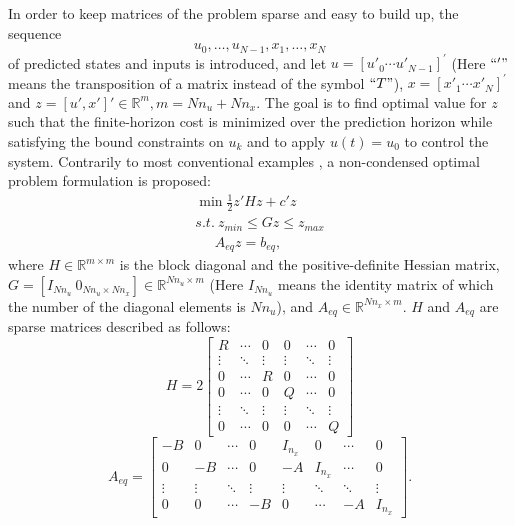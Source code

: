 \documentclass[journal]{IEEEtran}
\begin{document}
In order to keep matrices of the problem sparse and easy to build up, the sequence \[{u_0}, \ldots ,{u_{N - 1}},{x_1}, \ldots ,{x_N}\] of predicted states and inputs is introduced, and let $u = {\left[ {{u'_0} \cdots {u'_{N - 1}}} \right]^\prime }$ (Here $``'"$ means the transposition of a matrix instead of the symbol $``T"$), $x = {\left[ {{x'_1} \cdots {x'_N}} \right]^\prime }$  and $z = \left[ {u',x'} \right] '\in {\mathbb{R}^m},m = N{n_u} + N{n_x}$. The goal is to find optimal value for $z$ such that the finite-horizon cost is minimized over the prediction horizon while satisfying the bound constraints on $u_k$ and to apply $u\left( t \right) = {u_0}$ to control the system. Contrarily to most conventional examples \cite{garcia1989model}, a non-condensed optimal problem formulation is proposed:
\begin{equation}\label{qpproblem}
\begin{array}{l}
\min \frac{1}{2}z'Hz + c'z\\
s.t.\ z_{min} \le Gz \le z_{max}\\
\quad \ \, A_{eq}  z = b_{eq},
\end{array}
\end{equation}
where $H \in {\mathbb{R}^{m \times m}}$ is the block diagonal and the positive-definite Hessian matrix, $G = \left[ {{I_{N{n_u}}} \ {0_{N{n_u} \times N{n_x}}}} \right] \in {\mathbb{R}^{N{n_u} \times m}}$ (Here $I_{Nn_u}$ means the identity matrix of which the number of the diagonal elements is $Nn_u$), and $A_{eq}\in \mathbb{R}^{Nn_x \times m}$. $H$ and $A_{eq}$ are sparse matrices described as follows:
\[H = 2  \left[ {\begin{array}{*{20}{c}}
	R& \cdots &{0}&{0}&\cdots&{0}\\
	\vdots & \ddots &\vdots&\vdots&\ddots&\vdots\\
	{0}&\cdots&R&{0}&\cdots&{0}\\
	{0}&\cdots&{0}&Q&\cdots&{0}\\
	\vdots&\ddots&\vdots&\vdots& \ddots &\vdots\\
	{0}&\cdots&{0}&{0}&\cdots&Q
	\end{array}} \right]\]
\[{A_{eq}} = \left[ {\begin{array}{*{20}{c}}
	{ - B}&{0}&\cdots&{0}&{{I_{{n_x} }}}&{0}&\cdots&{0}\\
	{0}&{ - B}&\cdots&{0}&{ - A}&{{I_{{n_x} }}}&\cdots&{0}\\
	\vdots&\vdots& \ddots &\vdots&\vdots& \ddots & \ddots &\vdots\\
	{0}&{0}&\cdots&{ - B}&{0}&\cdots&{ - A}&{{I_{{n_x} }}}
	\end{array}}\right].\]
\end{document}
